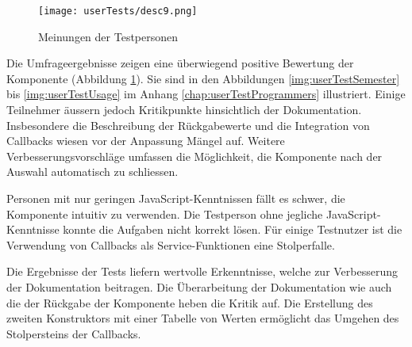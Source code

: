 \begin{figure}[!htb]
    \centering
    \texttt{[image: userTests/desc9.png]}
    \caption{\centering Meinungen der Testpersonen}
    \label{img:userTestsDescription}
\end{figure}

Die Umfrageergebnisse zeigen eine überwiegend positive Bewertung der Komponente (Abbildung \ref{img:userTestsDescription}). 
Sie sind in den Abbildungen \ref{img:userTestSemester} bis \ref{img:userTestUsage} im Anhang \ref{chap:userTestProgrammers} illustriert. 
Einige Teilnehmer äussern jedoch Kritikpunkte hinsichtlich der Dokumentation. 
Insbesondere die Beschreibung der Rückgabewerte und die Integration von Callbacks wiesen vor der Anpassung Mängel auf. 
Weitere Verbesserungsvorschläge umfassen die Möglichkeit, die Komponente nach der Auswahl automatisch zu schliessen. 

Personen mit nur geringen JavaScript-Kenntnissen fällt es schwer, die Komponente intuitiv zu verwenden. 
Die Testperson ohne jegliche JavaScript-Kenntnisse konnte die Aufgaben nicht korrekt lösen. 
Für einige Testnutzer ist die Verwendung von Callbacks als Service-Funktionen eine Stolperfalle. 

Die Ergebnisse der Tests liefern wertvolle Erkenntnisse, welche zur Verbesserung der Dokumentation beitragen. 
Die Überarbeitung der Dokumentation wie auch die der Rückgabe der Komponente heben die Kritik auf. 
Die Erstellung des zweiten Konstruktors mit einer Tabelle von Werten ermöglicht das Umgehen des Stolpersteins der Callbacks. 

